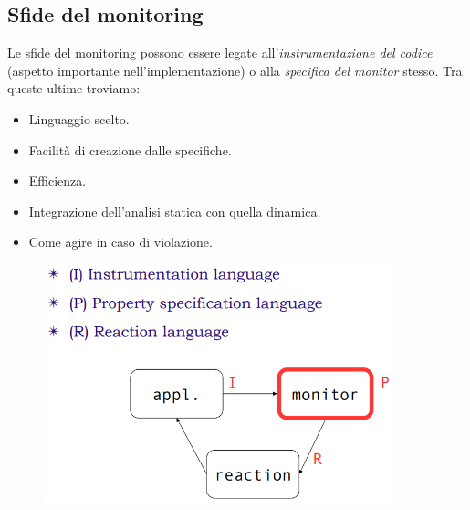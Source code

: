 \documentclass[a4paper,oneside,titlepage]{book}
\begin{document}
\subsection{Sfide del monitoring}
Le sfide del monitoring possono essere legate all'\textit{instrumentazione del codice} (aspetto importante nell'implementazione) o alla \textit{specifica del monitor} stesso. Tra queste ultime troviamo:
\begin{itemize}
    \item Linguaggio scelto.
    \item Facilità di creazione dalle specifiche.
    \item Efficienza.
    \item Integrazione dell'analisi statica con quella dinamica.
    \item Come agire in caso di violazione.
\end{itemize}
\begin{figure}[htp]
	\centering
	\includegraphics[width=0.9\textwidth]{monitor4.png}
\end{figure}
\end{document}
